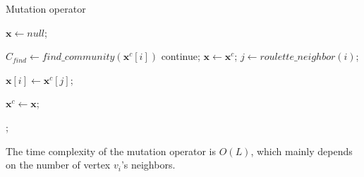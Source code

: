 \documentclass[10pt, journal]{IEEEtran}
\begin{document}
\begin{algorithm}[!htbp]

	\caption{Mutation operator} \label{algorithm:MOEACD:mutation}
	
    
    {$\textbf{x} \leftarrow null$;}

    {
   	{$C_{find} \leftarrow find\_community(\textbf{x}^c[i]) $}\;
   	 { continue;}
	{ $\textbf{x} \leftarrow \textbf{x}^c$;}
	{$j  \leftarrow  roulette\_neighbor(i)$;}
	
	{$\textbf{x}[i] \leftarrow  \textbf{x}^c[j]$;}
   }
   {$\textbf{x}^c \leftarrow \textbf{x}$;}
   
   {;}

%
 
\end{algorithm}
The time complexity of the mutation operator is $O(L)$, which mainly depends on the number of vertex $v_i$'s neighbors.
\end{document}
